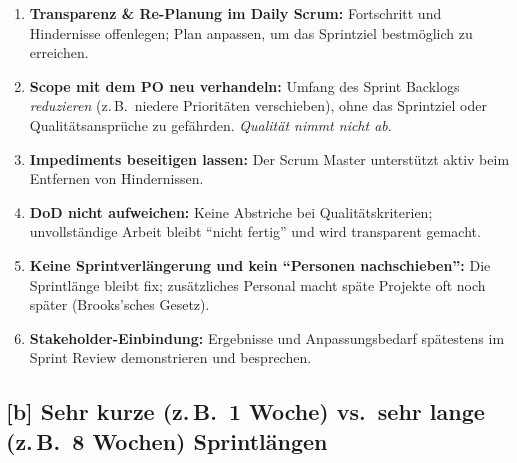 \documentclass[12pt]{article}
\begin{document}
\begin{enumerate}

  \item \textbf{Transparenz \& Re-Planung im Daily Scrum:} Fortschritt und Hindernisse offenlegen; Plan anpassen, um das Sprintziel bestmöglich zu erreichen.
  
  \item \textbf{Scope mit dem PO neu verhandeln:} Umfang des Sprint Backlogs \emph{reduzieren} (z.\,B.\ niedere Prioritäten verschieben), ohne das Sprintziel oder Qualitätsansprüche zu gefährden. \emph{Qualität nimmt nicht ab}.

  \item \textbf{Impediments beseitigen lassen:} Der Scrum Master unterstützt aktiv beim Entfernen von Hindernissen.
  
  \item \textbf{DoD nicht aufweichen:} Keine Abstriche bei Qualitätskriterien; unvollständige Arbeit bleibt \enquote{nicht fertig} und wird transparent gemacht.
  
  \item \textbf{Keine Sprintverlängerung und kein \enquote{Personen nachschieben}:} Die Sprintlänge bleibt fix; zusätzliches Personal macht späte Projekte oft noch später (Brooks’sches Gesetz).
  
  \item \textbf{Stakeholder-Einbindung:} Ergebnisse und Anpassungsbedarf spätestens im Sprint Review demonstrieren und besprechen.

\end{enumerate}

\newpage

\subsection*{[b] Sehr kurze (z.\,B.\ 1 Woche) vs.\ sehr lange (z.\,B.\ 8 Wochen) Sprintlängen}
\end{document}
